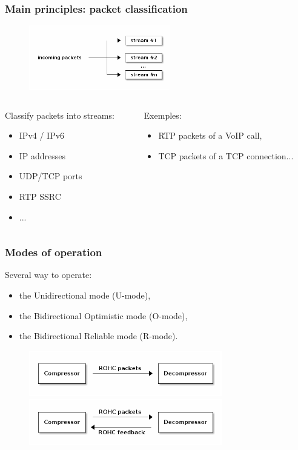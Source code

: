 \documentclass[utf8]{beamer}
\begin{document}
\begin{frame}
	\frametitle{Main principles: packet classification}
	\begin{figure}
		\includegraphics[height=28mm]{images/rohc_classification.png}
	\end{figure}
	\begin{columns}
		\begin{column}[T]{50mm}
			Classify packets into streams: 
			\begin{itemize}
				\item IPv4 / IPv6
				\item IP addresses
				\item UDP/TCP ports
				\item RTP SSRC
				\item ...
			\end{itemize}
		\end{column}
		\begin{column}[T]{50mm}
			Exemples:
			\begin{itemize}
				\item RTP packets of a VoIP call,
				\item TCP packets of a TCP connection...
			\end{itemize}
		\end{column}
	\end{columns}
\end{frame}
\begin{frame}
	\frametitle{Modes of operation}
	Several way to operate:
	\begin{itemize}
		\item the Unidirectional mode (U-mode),
		\item the Bidirectional Optimistic mode (O-mode),
		\item the Bidirectional Reliable mode (R-mode).
	\end{itemize}
	\begin{figure}
		\includegraphics[height=20mm]{images/rohc_umode.png} \\
		\includegraphics[height=20mm]{images/rohc_omode.png}
	\end{figure}
\end{frame}
\end{document}
